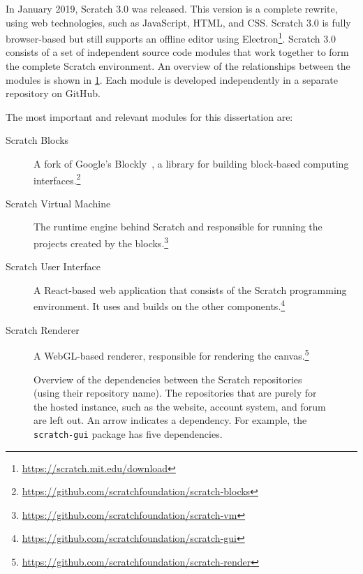 \documentclass[../main]{subfiles}
\begin{document}
In January 2019, Scratch 3.0 was released.
This version is a complete rewrite, using web technologies, such as JavaScript, HTML, and CSS\@.
Scratch 3.0 is fully browser-based but still supports an offline editor using Electron\footnote{\url{https://scratch.mit.edu/download}}.
Scratch 3.0 consists of a set of independent source code modules that work together to form the complete Scratch environment.
An overview of the relationships between the modules is shown in \cref{fig:scratch-dependencies}.
Each module is developed independently in a separate repository on GitHub.

{
    \makeatletter
    \makeatother
    The most important and relevant modules for this dissertation are:

    \begin{description}
        \item[Scratch Blocks] A fork of Google's Blockly~\autocite{pasternakTipsCreatingBlock2017}, a library for building block-based computing interfaces.\footnote{\url{https://github.com/scratchfoundation/scratch-blocks}}
        \item[Scratch Virtual Machine] The runtime engine behind Scratch and responsible for running the projects created by the blocks.\footnote{\url{https://github.com/scratchfoundation/scratch-vm}}
        \item[Scratch User Interface] A React-based web application that consists of the Scratch programming environment.
        It uses and builds on the other components.\footnote{\url{https://github.com/scratchfoundation/scratch-gui}}
        \item[Scratch Renderer] A WebGL-based renderer, responsible for rendering the canvas.\footnote{\url{https://github.com/scratchfoundation/scratch-render}}
    \end{description}
}

\begin{figure}
    \begin{wide}
        
    \end{wide}
    \caption{
        Overview of the dependencies between the Scratch repositories (using their repository name).
        The repositories that are purely for the hosted instance, such as the website, account system, and forum are left out.
        An arrow indicates a dependency.
        For example, the \texttt{scratch-gui} package has five dependencies.
    }
    \label{fig:scratch-dependencies}
\end{figure}
\end{document}
